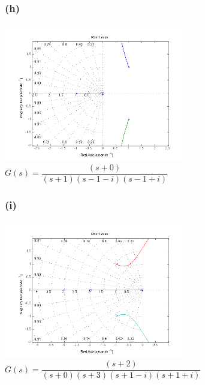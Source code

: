 \documentclass[letterpaper,10pt]{article}
\begin{document}
\subsubsection*{(h)}
\begin{center}
    \includegraphics[width=0.6\textwidth]{homework04-7-1-h.png} \\
   $G(s) = \dfrac{(s+0)}{(s+1)(s-1-i)(s-1+i)}$
\end{center}
\subsubsection*{(i)}
\begin{center}
    \includegraphics[width=0.6\textwidth]{homework04-7-1-i.png} \\
   $G(s) = \dfrac{(s+2)}{(s+0)(s+3)(s+1-i)(s+1+i)}$
\end{center}
\end{document}
